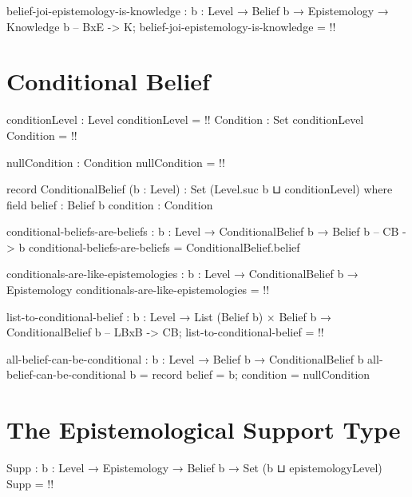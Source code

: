 \documentclass{article}
\begin{document}
\begin{code}
belief-joi-epistemology-is-knowledge :
  {b : Level} → Belief b → Epistemology → Knowledge b -- BxE -> K;
belief-joi-epistemology-is-knowledge = {!!}
\end{code}

\section{Conditional Belief}

\begin{code}
conditionLevel : Level
conditionLevel = {!!}
Condition : Set conditionLevel
Condition = {!!}

nullCondition : Condition
nullCondition = {!!}

record ConditionalBelief (b : Level) : Set (Level.suc b ⊔ conditionLevel) where
  field
    belief : Belief b
    condition : Condition
\end{code}

\begin{code}
conditional-beliefs-are-beliefs : {b : Level} → ConditionalBelief b → Belief b -- CB -> b
conditional-beliefs-are-beliefs = ConditionalBelief.belief
\end{code}

\begin{code}
conditionals-are-like-epistemologies :
  {b : Level} → ConditionalBelief b → Epistemology
conditionals-are-like-epistemologies = {!!}
\end{code}

\begin{code}
list-to-conditional-belief :
  {b : Level} → List (Belief b) × Belief b → ConditionalBelief b -- LBxB -> CB;
list-to-conditional-belief = {!!}
\end{code}

\begin{code}
all-belief-can-be-conditional : {b : Level} → Belief b → ConditionalBelief b
all-belief-can-be-conditional b = record {belief = b; condition = nullCondition}
\end{code}

\section{The Epistemological Support Type}

\begin{code}
Supp : {b : Level} → Epistemology → Belief b → Set (b ⊔ epistemologyLevel)
Supp = {!!}
\end{code}
\end{document}
